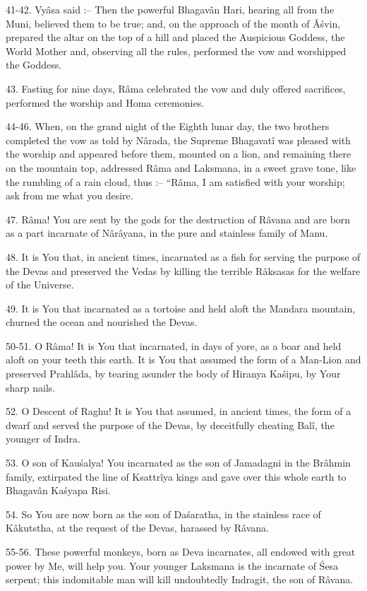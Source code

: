 41-42. Vy\^asa said :-- Then the powerful Bhagav\^an Hari, hearing all from the Muni, believed them to be true; and, on the approach of the month of Â\'svin, prepared the altar on the top of a hill and placed the Auspicious Goddess, the World Mother and, observing all the rules, performed the vow and worshipped the Goddess.

43. Fasting for nine days, R\^ama celebrated the vow and duly offered sacrifices, performed the worship and Homa ceremonies.

44-46. When, on the grand night of the Eighth lunar day, the two brothers completed the vow as told by N\^arada, the Supreme Bhagavat\^i was pleased with the worship and appeared before them, mounted on a lion, and remaining there on the mountain top, addressed R\^ama and Laksmana, in a sweet grave tone, like the rumbling of a rain cloud, thus :-- ``R\^ama, I am satisfied with your worship; ask from me what you desire.

47. R\^ama! You are sent by the gods for the destruction of R\^avana and are born as a part incarnate of N\^ar\^ayana, in the pure and stainless family of Manu.

48. It is You that, in ancient times, incarnated as a fish for serving the purpose of the Devas and preserved the Vedas by killing the terrible R\^aksasas for the welfare of the Universe.

49. It is You that incarnated as a tortoise and held aloft the Mandara mountain, churned the ocean and nourished the Devas.

50-51. O R\^ama! It is You that incarnated, in days of yore, as a boar and held aloft on your teeth this earth. It is You that assumed the form of a Man-Lion and preserved Prahl\^ada, by tearing asunder the body of Hiranya Ka\'sipu, by Your sharp nails.

52. O Descent of Raghu! It is You that assumed, in ancient times, the form of a dwarf and served the purpose of the Devas, by deceitfully cheating Bal\^i, the younger of Indra.

53. O son of Kau\'salya! You incarnated as the son of Jamadagni in the Br\^ahmin family, extirpated the line of Ksattr\^iya kings and gave over this whole earth to Bhagav\^an Ka\'syapa Risi.

54. So You are now born as the son of Da\'saratha, in the stainless race of K\^akutstha, at the request of the Devas, harassed by R\^avana.

55-56. These powerful monkeys, born as Deva incarnates, all endowed with great power by Me, will help you. Your younger Laksmana is the incarnate of \'Sesa serpent; this indomitable man will kill undoubtedly Indragit, the son of R\^avana.

